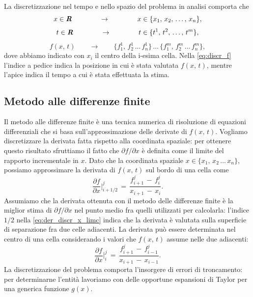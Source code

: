 La discretizzazione nel tempo e nello spazio del problema in analisi comporta che
\begin{equation}
x \in \textbf{\textit{R}} \qquad \qquad \rightarrow \qquad \qquad x \in \{x_1,\,x_2,\,\dots,\,x_n\},
\label{eq:discr_x}
\end{equation}
\begin{equation}
t \in \textbf{\textit{R}} \qquad \qquad \rightarrow \qquad \qquad t \in \{t^1,\,t^2,\,\dots,\,t^m\},
\label{eq:discr_t}
\end{equation}
\begin{equation}
f(x,\,t) \qquad \rightarrow \qquad \{f_1^1,\,f_2^1\,\dots\,f_n^1\}\,\dots\,\{f_1^m,\,f_2^m\,\dots\,f_n^m\},
\label{eq:discr_f}
\end{equation}
dove abbiamo indicato con $x_i$ il centro della i-esima cella.
Nella \eqref{eq:discr_f} l'indice a pedice indica la posizione in cui è stata valutata $f(x,\,t)$, mentre l'apice indica il tempo a cui è stata effettuata la stima.

\subsection{Metodo alle differenze finite} \label{subsec:diff_fin}

Il metodo alle differenze finite è una tecnica numerica di risoluzione di equazioni differenziali che si basa sull'approssimazione delle derivate di $f(x,\,t)$.
Vogliamo discretizzare la derivata fatta rispetto alla coordinata spaziale: per ottenere questo risultato sfruttiamo il fatto che $\partial f/\partial x$ è definita come il limite del rapporto incrementale in $x$.
Dato che la coordinata spaziale $x \in \{x_1,\,x_2\,\dots\,x_n\}$, possiamo approssimare la derivata di $f(x,\,t)$ sul bordo di una cella come
\begin{equation}
\frac{\partial f}{\partial x}\bigg|_{i+1/2}^j\,=\,\frac{f_{i+1}^j\,-\,f_{i}^j}{x_{i+1}\,-\,x_{i}}.
\label{eq:der_discr_x_limc}
\end{equation}
Assumiamo che la derivata ottenuta con il metodo delle differenze finite è la miglior stima di $\partial f/\partial x$ nel punto medio fra quelli utilizzati per calcolarla: l'indice $1/2$ nella \eqref{eq:der_discr_x_limc} indica che la derivata è valutata sulla superficie di separazione fra due celle adiacenti.
La derivata può essere determinata nel centro di una cella considerando i valori che $f(x,\,t)$ assume nelle due adiacenti:
\begin{equation}
\frac{\partial f}{\partial x}\bigg|_{i}^j\,=\,\frac{f_{i+1}^j\,-\,f_{i-1}^j}{x_{i+1}\,-\,x_{i-1}}.
\label{eq:der_discr_x_cenc}
\end{equation}
La discretizzazione del problema comporta l'insorgere di errori di troncamento: per determinarne l'entità lavoriamo con delle opportune espansioni di Taylor per una generica funzione $g(x)$. 

